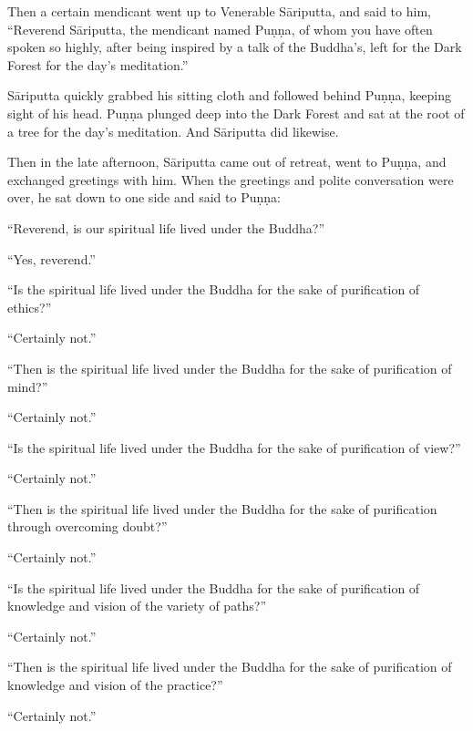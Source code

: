 \documentclass[12pt,openany]{book}%
\begin{document}
Then a certain mendicant went up to Venerable \textsanskrit{Sāriputta}, and said to him, “Reverend \textsanskrit{Sāriputta}, the mendicant named \textsanskrit{Puṇṇa}, of whom you have often spoken so highly, after being inspired by a talk of the Buddha’s, left for the Dark Forest for the day’s meditation.” 

\textsanskrit{Sāriputta} quickly grabbed his sitting cloth and followed behind \textsanskrit{Puṇṇa}, keeping sight of his head. \textsanskrit{Puṇṇa} plunged deep into the Dark Forest and sat at the root of a tree for the day’s meditation. And \textsanskrit{Sāriputta} did likewise. 

Then in the late afternoon, \textsanskrit{Sāriputta} came out of retreat, went to \textsanskrit{Puṇṇa}, and exchanged greetings with him. When the greetings and polite conversation were over, he sat down to one side and said to \textsanskrit{Puṇṇa}: 

“Reverend, is our spiritual life lived under the Buddha?” 

“Yes, reverend.” 

“Is the spiritual life lived under the Buddha for the sake of purification of ethics?” 

“Certainly not.” 

“Then is the spiritual life lived under the Buddha for the sake of purification of mind?” 

“Certainly not.” 

“Is the spiritual life lived under the Buddha for the sake of purification of view?” 

“Certainly not.” 

“Then is the spiritual life lived under the Buddha for the sake of purification through overcoming doubt?” 

“Certainly not.” 

“Is the spiritual life lived under the Buddha for the sake of purification of knowledge and vision of the variety of paths?” 

“Certainly not.” 

“Then is the spiritual life lived under the Buddha for the sake of purification of knowledge and vision of the practice?” 

“Certainly not.” 
\end{document}
